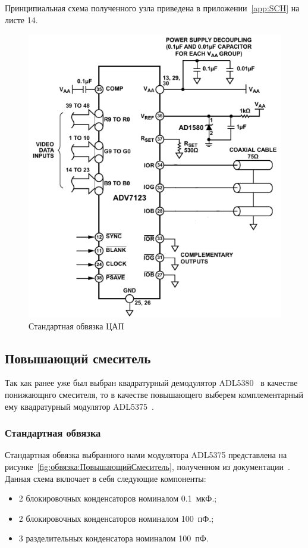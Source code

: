 \documentclass[utf8x, 14pt, oneside, a4paper]{article}
\begin{document}
				Принципиальная схема полученного узла приведена в приложении~\ref{app:SCH} на листе 14.
				\begin{figure}[h!]
					\centering
					\includegraphics[width=0.7\linewidth]{"Обвязка ЦАП"}
					\caption{Стандартная обвязка ЦАП}
					\label{fig:обвязка:ЦАП}
				\end{figure}
			
		\subsection{Повышающий смеситель}
			Так как ранее уже был выбран квадратурный демодулятор ADL5380~\cite{bib:ПонижающийСмеситель} в качестве понижающнго смесителя, то в качестве повышающего выберем комплементарный ему квадратурный модулятор ADL5375~\cite{bib:ПовышающийСмеситель}.
			
			\subsubsection{Стандартная обвязка}
				Стандартная обвязка выбранного нами модулятора ADL5375 представлена на рисунке~\ref{fig:обвязка:ПовышающийСмеситель}, полученном из документации~\cite{bib:ПовышающийСмеситель}. Данная схема включает в себя следующие компоненты:
				\begin{itemize}
					\item 2 блокировочных конденсаторов номиналом 0.1~мкФ.;
					\item 2 блокировочных конденсаторов номиналом 100~пФ.;
					\item 3 разделительных конденсатора номиналом 100~пФ.
				\end{itemize}
			
\end{document}
